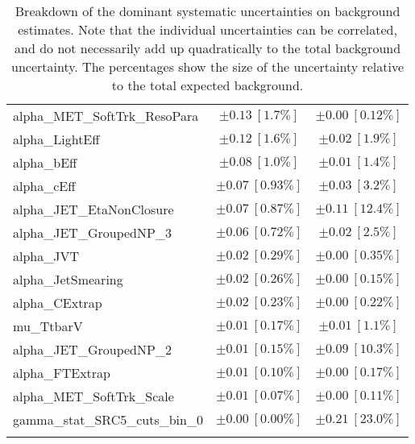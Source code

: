 \begin{table}
\begin{center}
\begin{tabular*}{\textwidth}{@{\extracolsep{\fill}}lcc}
alpha\_MET\_SoftTrk\_ResoPara         & $\pm 0.13\ [1.7\%] $          & $\pm 0.00\ [0.12\%] $       \\
alpha\_LightEff         & $\pm 0.12\ [1.6\%] $          & $\pm 0.02\ [1.9\%] $       \\
alpha\_bEff         & $\pm 0.08\ [1.0\%] $          & $\pm 0.01\ [1.4\%] $       \\
alpha\_cEff         & $\pm 0.07\ [0.93\%] $          & $\pm 0.03\ [3.2\%] $       \\
alpha\_JET\_EtaNonClosure         & $\pm 0.07\ [0.87\%] $          & $\pm 0.11\ [12.4\%] $       \\
alpha\_JET\_GroupedNP\_3         & $\pm 0.06\ [0.72\%] $          & $\pm 0.02\ [2.5\%] $       \\
alpha\_JVT         & $\pm 0.02\ [0.29\%] $          & $\pm 0.00\ [0.35\%] $       \\
alpha\_JetSmearing         & $\pm 0.02\ [0.26\%] $          & $\pm 0.00\ [0.15\%] $       \\
alpha\_CExtrap         & $\pm 0.02\ [0.23\%] $          & $\pm 0.00\ [0.22\%] $       \\
mu\_TtbarV         & $\pm 0.01\ [0.17\%] $          & $\pm 0.01\ [1.1\%] $       \\
alpha\_JET\_GroupedNP\_2         & $\pm 0.01\ [0.15\%] $          & $\pm 0.09\ [10.3\%] $       \\
alpha\_FTExtrap         & $\pm 0.01\ [0.10\%] $          & $\pm 0.00\ [0.17\%] $       \\
alpha\_MET\_SoftTrk\_Scale         & $\pm 0.01\ [0.07\%] $          & $\pm 0.00\ [0.11\%] $       \\
gamma\_stat\_SRC5\_cuts\_bin\_0         & $\pm 0.00\ [0.00\%] $          & $\pm 0.21\ [23.0\%] $       \\
\noalign{\smallskip}\hline\noalign{\smallskip}
\end{tabular*}
\end{center}
\caption[Breakdown of uncertainty on background estimates]{
Breakdown of the dominant systematic uncertainties on background estimates.
Note that the individual uncertainties can be correlated, and do not necessarily add up quadratically to 
the total background uncertainty. The percentages show the size of the uncertainty relative to the total expected background.
\label{table.results.bkgestimate.uncertainties.SRC4_SRC5}}
\end{table}
%